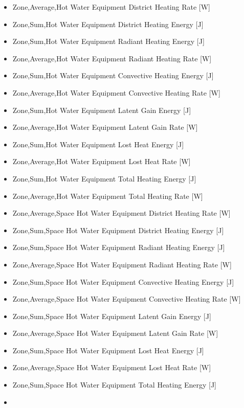 \begin{itemize}
\item
  Zone,Average,Hot Water Equipment District Heating Rate {[}W{]}
\item
  Zone,Sum,Hot Water Equipment District Heating Energy {[}J{]}
\item
  Zone,Sum,Hot Water Equipment Radiant Heating Energy {[}J{]}
\item
  Zone,Average,Hot Water Equipment Radiant Heating Rate {[}W{]}
\item
  Zone,Sum,Hot Water Equipment Convective Heating Energy {[}J{]}
\item
  Zone,Average,Hot Water Equipment Convective Heating Rate {[}W{]}
\item
  Zone,Sum,Hot Water Equipment Latent Gain Energy {[}J{]}
\item
  Zone,Average,Hot Water Equipment Latent Gain Rate {[}W{]}
\item
  Zone,Sum,Hot Water Equipment Lost Heat Energy {[}J{]}
\item
  Zone,Average,Hot Water Equipment Lost Heat Rate {[}W{]}
\item
  Zone,Sum,Hot Water Equipment Total Heating Energy {[}J{]}
\item
  Zone,Average,Hot Water Equipment Total Heating Rate {[}W{]}
\item
  Zone,Average,Space Hot Water Equipment District Heating Rate {[}W{]}
\item
  Zone,Sum,Space Hot Water Equipment District Heating Energy {[}J{]}
\item
  Zone,Sum,Space Hot Water Equipment Radiant Heating Energy {[}J{]}
\item
  Zone,Average,Space Hot Water Equipment Radiant Heating Rate {[}W{]}
\item
  Zone,Sum,Space Hot Water Equipment Convective Heating Energy {[}J{]}
\item
  Zone,Average,Space Hot Water Equipment Convective Heating Rate {[}W{]}
\item
  Zone,Sum,Space Hot Water Equipment Latent Gain Energy {[}J{]}
\item
  Zone,Average,Space Hot Water Equipment Latent Gain Rate {[}W{]}
\item
  Zone,Sum,Space Hot Water Equipment Lost Heat Energy {[}J{]}
\item
  Zone,Average,Space Hot Water Equipment Lost Heat Rate {[}W{]}
\item
  Zone,Sum,Space Hot Water Equipment Total Heating Energy {[}J{]}
\item

\end{itemize}
